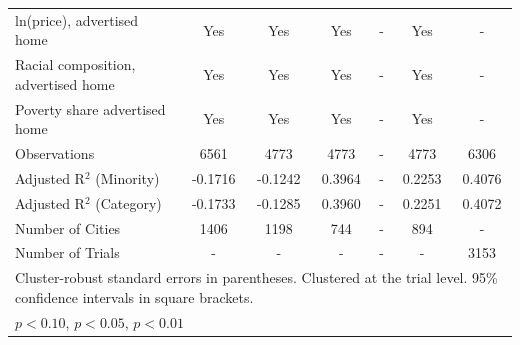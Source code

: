 \begin{table}[htbp]
{\begin{tabular}{l*{6}{c}}
ln(price), advertised home  & Yes & Yes & Yes & - & Yes & - \\
Racial composition, advertised home & Yes & Yes & Yes & - & Yes & - \\
Poverty share advertised home & Yes & Yes & Yes & - & Yes & - \\
Observations & 6561 & 4773 & 4773 & - & 4773 & 6306 \\
Adjusted R$^2$ (Minority) & -0.1716 & -0.1242 & 0.3964 & - & 0.2253 & 0.4076 \\
Adjusted R$^2$ (Category) & -0.1733 & -0.1285 & 0.3960 & - & 0.2251 & 0.4072 \\
Number of Cities & 1406 & 1198 & 744 & - & 894 & - \\
Number of Trials & - & - & - & - & - & 3153 \\
\bottomrule
\multicolumn{7}{l}{\footnotesize Cluster-robust standard errors in parentheses. Clustered at the trial level. 95\% confidence intervals in square brackets.}\\
\multicolumn{7}{l}{\footnotesize \sym{*} \(p<0.10\), \sym{**} \(p<0.05\), \sym{***} \(p<0.01\)}\\
\end{tabular}
}
\end{table}
